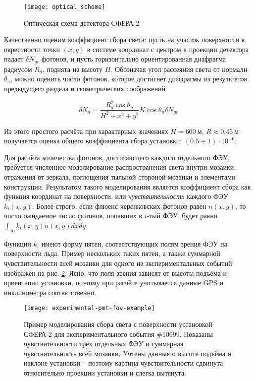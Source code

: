 \begin{figure}
	\centering
	\texttt{[image: optical\_scheme]}
	\caption{Оптическая схема детектора СФЕРА-2}
	\label{pic:sphere-detector-optical-scheme}
\end{figure}

Качественно оценим коэффициент сбора света: пусть на участок поверхности в окрестности точки $(x, y)$ в системе координат с центром в проекции детектора падает $\delta N_{gr}$ фотонов, и пусть горизонтально ориентированная диафрагма радиусом $R_{d}$, поднята на высоту $H$. Обозначая угол рассеяния света от нормали $\theta_n$, можно оценить число фотонов, которое достигнет диафрагмы из результатов предыдущего раздела и геометрических соображений

\begin{equation}
	\delta N_{d} = \frac{R_d^2 \cos \theta_n}{H^2 + x^2 + y^2} K \cos \theta_n \delta N_{gr}
\end{equation}

Из этого простого расчёта при характерных значениях $H = 600~\text{м}$, $R \approx 0.45~\text{м}$ получается оценка общего коэффициента сбора установки: $(0.5 \div 1) \cdot 10^{-6}$.

Для расчёта количества фотонов, достигающего каждого отдельного ФЭУ, требуется численное моделирование распространения света внутри мозаики, отражения от зеркала, поглощения тыльной стороной мозаики и элементами конструкции. Результатом такого моделирования является коэффициент сбора как функция координат на поверхности, или \textit{чувствительность} каждого ФЭУ $k_i(x, y)$. Более строго, если флюенс черенковских фотонов равен $n(x, y)$, то число ожидаемое число фотонов, попавших в $i$-тый ФЭУ, будет равно $\int_{\infty} k_i(x, y) n(x, y) dx dy$.

Функции $k_i$ имеют форму пятен, соответствующих полям зрения ФЭУ на поверхности льда. Пример нескольких таких пятен, а также суммарной чувствительности всей мозаики для одного из экспериментальных событий изображён на рис. \ref{pic:experimental-pmt-fov-example}. Ясно, что поля зрения зависят от высоты подъёма и ориентации установки, поэтому при расчёте учитывается данные GPS и инклинометра соответственно.

\begin{figure}
	\centering
	\texttt{[image: experimental-pmt-fov-example]}
	\caption{Пример моделирования сбора света с поверхности установкой СФЕРА-2 для экспериментального события \#10699. Показаны чувствительности трёх отдельных ФЭУ и суммарная чувствительность всей мозаики. Учтены данные о высоте подъёма и наклоне установки -- поэтому картина чувствительности сдвинута относительно проекции установки и слегка вытянута.}
	\label{pic:experimental-pmt-fov-example}
\end{figure}

